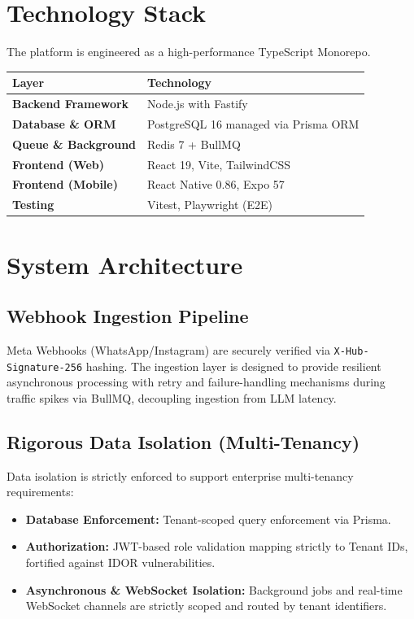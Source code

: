 \documentclass[11pt,a4paper]{report}
\begin{document}
\section{Technology Stack}
The platform is engineered as a high-performance TypeScript Monorepo.

\begin{table}[h]
\centering
\renewcommand{\arraystretch}{1.2}
\begin{tabularx}{\textwidth}{l X}
\toprule
\textbf{Layer} & \textbf{Technology} \\
\midrule
\textbf{Backend Framework} & Node.js with Fastify \\
\textbf{Database \& ORM} & PostgreSQL 16 managed via Prisma ORM \\
\textbf{Queue \& Background} & Redis 7 + BullMQ \\
\textbf{Frontend (Web)} & React 19, Vite, TailwindCSS \\
\textbf{Frontend (Mobile)} & React Native 0.86, Expo 57 \\
\textbf{Testing} & Vitest, Playwright (E2E) \\
\bottomrule
\end{tabularx}
\end{table}

\section{System Architecture}

\subsection{Webhook Ingestion Pipeline}
Meta Webhooks (WhatsApp/Instagram) are securely verified via \texttt{X-Hub-Signature-256} hashing. The ingestion layer is designed to provide resilient asynchronous processing with retry and failure-handling mechanisms during traffic spikes via BullMQ, decoupling ingestion from LLM latency.

\subsection{Rigorous Data Isolation (Multi-Tenancy)}
Data isolation is strictly enforced to support enterprise multi-tenancy requirements:
\begin{itemize}
    \item \textbf{Database Enforcement:} Tenant-scoped query enforcement via Prisma.
    \item \textbf{Authorization:} JWT-based role validation mapping strictly to Tenant IDs, fortified against IDOR vulnerabilities.
    \item \textbf{Asynchronous \& WebSocket Isolation:} Background jobs and real-time WebSocket channels are strictly scoped and routed by tenant identifiers.
\end{itemize}
\end{document}
